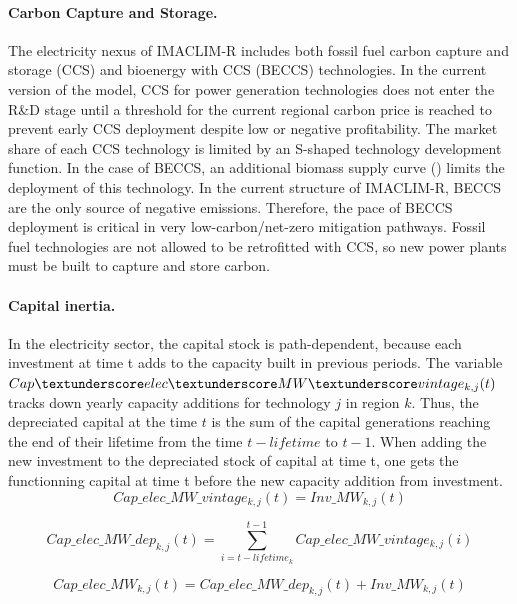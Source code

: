 \paragraph{ Carbon Capture and Storage.}
The electricity nexus of IMACLIM-R includes both fossil fuel carbon capture and storage (CCS) and bioenergy with CCS (BECCS) technologies. In the current version of the model, CCS for power generation technologies does not enter the R\&D stage until a threshold for the current regional carbon price is reached to prevent early CCS deployment despite low or negative profitability. The market share of each CCS technology is limited by an S-shaped technology development function. In the case of BECCS, an additional biomass supply curve (\cite{Hoogwijk2009}) limits the deployment of this technology. In the current structure of IMACLIM-R, BECCS are the only source of negative emissions. Therefore, the pace of BECCS deployment is critical in very low-carbon/net-zero mitigation pathways. Fossil fuel technologies are not allowed to be retrofitted with CCS, so new power plants must be built to capture and store carbon.


\paragraph{ Capital inertia.}
In the electricity sector, the capital stock is path-dependent, because each investment at time t adds to the capacity built in previous periods. The variable $Cap\textunderscore elec\textunderscore MW\textunderscore vintage_{k,j}(t)$ tracks down yearly capacity additions for technology $j$ in region $k$. Thus, the depreciated capital at the time $t$ is the sum of the capital generations reaching the end of their lifetime from the time $t - lifetime$ to $t - 1$. When adding the new investment to the depreciated stock of capital at time t, one gets the functionning capital at time t before the new capacity addition from investment.
\begin{dmath}
    Cap\_elec\_ MW\_vintage_{k,j}(t) = Inv\_MW_{k,j}(t)
    \label{eqn:Cap_elec_vintage}
\end{dmath}

\begin{dmath}
    Cap\_elec\_MW\_dep_{k,j}(t) = \sum_{i = t - lifetime_{k}}^{t-1}Cap\_elec\_MW\_vintage_{k,j}(i)
    \label{eqn:Cap_elec_dep}
\end{dmath}

\begin{dmath}
    Cap\_elec\_MW_{k,j}(t) = Cap\_elec\_MW\_dep_{k,j}(t) + Inv\_MW_{k,j}(t)
    \label{eqn:Cap_elec}
\end{dmath}





